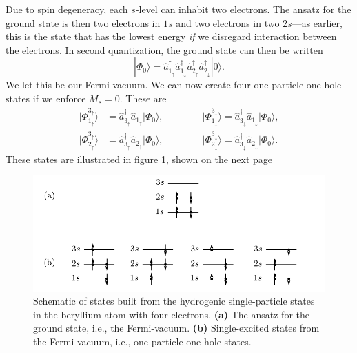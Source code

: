\documentclass[a4paper, 11pt, notitlepage, english]{article}
\newcommand{\ket}[1]{|#1 \rangle}
\newcommand{\op}[1]{\hat{#1}}
\renewcommand{\d}{{\rm d}}
\renewcommand{\u}{\uparrow}
\renewcommand{\d}{\downarrow}
\begin{document}
Due to spin degeneracy, each $s$-level can inhabit two electrons. The ansatz for the ground state is then two electrons in $1s$ and two electrons in two $2s$---as earlier, this is the state that has the lowest energy \emph{if} we disregard interaction between the electrons. In second quantization, the ground state can then be written
$$\ket{\Phi_0} = \op{a}_{1_\u}^\dagger\op{a}_{1_\d}^\dagger\op{a}_{2_\u}^\dagger\op{a}_{2_\d}^\dagger \ket{0}.$$
We let this be our Fermi-vacuum. We can now create four one-particle-one-hole states if we enforce $M_s = 0$. These are
\begin{align*}
\ket{\Phi_{1_\u}^{3_\u}} &= \op{a}_{3_\u}^\dagger \op{a}_{1_\u} \ket{\Phi_0}, \qquad\qquad
\ket{\Phi_{1_\d}^{3_\d}} = \op{a}_{3_\d}^\dagger \op{a}_{1_\d} \ket{\Phi_0}, \\
\ket{\Phi_{2_\u}^{3_\u}} &= \op{a}_{3_\u}^\dagger \op{a}_{2_\u} \ket{\Phi_0}, 
\qquad\qquad
\ket{\Phi_{2_\d}^{3_\d}} = \op{a}_{3_\d}^\dagger \op{a}_{2_\d} \ket{\Phi_0}.
\end{align*}
These states are illustrated in figure \ref{fig:1d}, shown on the next page

\begin{figure}[thbp]
\includegraphics{project1d.pdf}
\caption{Schematic of states built from the hydrogenic single-particle states in the beryllium atom with four electrons. \textbf{(a)} The ansatz for the ground state, i.e., the Fermi-vacuum. \textbf{(b)} Single-excited states from the Fermi-vacuum, i.e., one-particle-one-hole states. \label{fig:1d}}	
\end{figure}

\newpage
\end{document}
